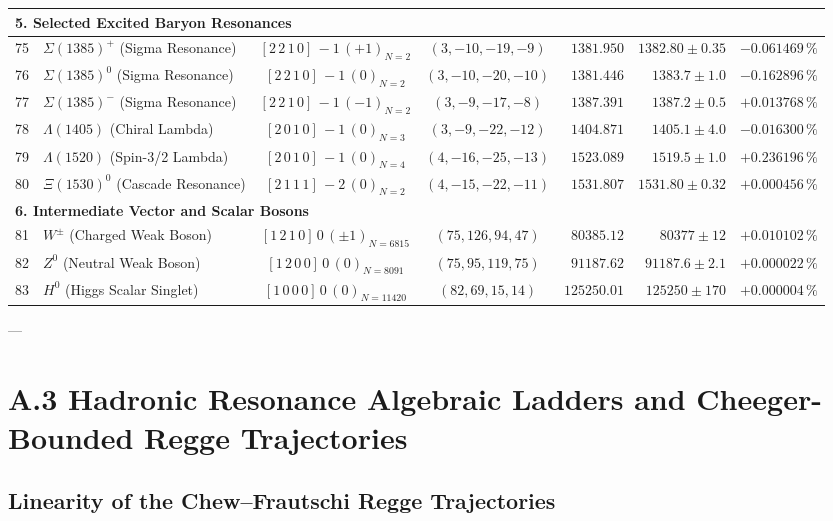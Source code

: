\documentclass[
    12pt,
    a4paper,
    headings=normal,
    twoside=false,
    open=any,
    parskip=half
]{scrbook}
\begin{document}
\begin{longtable}{clccrrr}
\multicolumn{7}{l}{\textsf{\textbf{\color{maincolor!90!black}5. Selected Excited Baryon Resonances}}} \\\midrule
75 & $\Sigma(1385)^+$ (Sigma Resonance) & $[2 \, 2 \, 1 \, 0] \, -1 \, (+1)_{N=2}$ & $(3, -10, -19, -9)$ & $1381.950$ & $1382.80 \pm 0.35$ & $-0.061469\,\%$ \\
76 & $\Sigma(1385)^0$ (Sigma Resonance) & $[2 \, 2 \, 1 \, 0] \, -1 \, (0)_{N=2}$ & $(3, -10, -20, -10)$ & $1381.446$ & $1383.7 \pm 1.0$ & $-0.162896\,\%$ \\
77 & $\Sigma(1385)^-$ (Sigma Resonance) & $[2 \, 2 \, 1 \, 0] \, -1 \, (-1)_{N=2}$ & $(3, -9, -17, -8)$ & $1387.391$ & $1387.2 \pm 0.5$ & $+0.013768\,\%$ \\
78 & $\Lambda(1405)$ (Chiral Lambda) & $[2 \, 0 \, 1 \, 0] \, -1 \, (0)_{N=3}$ & $(3, -9, -22, -12)$ & $1404.871$ & $1405.1 \pm 4.0$ & $-0.016300\,\%$ \\
79 & $\Lambda(1520)$ (Spin-3/2 Lambda) & $[2 \, 0 \, 1 \, 0] \, -1 \, (0)_{N=4}$ & $(4, -16, -25, -13)$ & $1523.089$ & $1519.5 \pm 1.0$ & $+0.236196\,\%$ \\
80 & $\Xi(1530)^0$ (Cascade Resonance) & $[2 \, 1 \, 1 \, 1] \, -2 \, (0)_{N=2}$ & $(4, -15, -22, -11)$ & $1531.807$ & $1531.80 \pm 0.32$ & $+0.000456\,\%$ \\\midrule
\multicolumn{7}{l}{\textsf{\textbf{\color{maincolor!90!black}6. Intermediate Vector and Scalar Bosons}}} \\\midrule
81 & $W^\pm$ (Charged Weak Boson) & $[1 \, 2 \, 1 \, 0] \, 0 \, (\pm 1)_{N=6815}$ & $(75, 126, 94, 47)$ & $80385.12$ & $80377 \pm 12$ & $+0.010102\,\%$ \\
82 & $Z^0$ (Neutral Weak Boson) & $[1 \, 2 \, 0 \, 0] \, 0 \, (0)_{N=8091}$ & $(75, 95, 119, 75)$ & $91187.62$ & $91187.6 \pm 2.1$ & $+0.000022\,\%$ \\
83 & $H^0$ (Higgs Scalar Singlet) & $[1 \, 0 \, 0 \, 0] \, 0 \, (0)_{N=11420}$ & $(82, 69, 15, 14)$ & $125250.01$ & $125250 \pm 170$ & $+0.000004\,\%$ \\\bottomrule
\end{longtable}

---

\section{A.3 Hadronic Resonance Algebraic Ladders and Cheeger-Bounded Regge Trajectories}
\label{sec:appA_regge_ladders}

\subsection{Linearity of the Chew--Frautschi Regge Trajectories}
\end{document}
